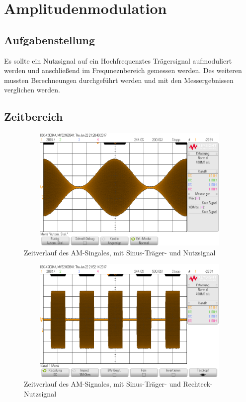 \section{Amplitudenmodulation}

\subsection{Aufgabenstellung}
Es sollte ein Nutzsignal auf ein Hochfrequenztes Tr\"agersignal aufmoduliert werden und anschlie\ss{}end im Frequneznbereich gemessen werden. Des weiteren mussten Berechneungen durchgef\"uhrt werden und mit den Messergebnissen verglichen werden.

\subsection{Zeitbereich}

\begin{figure}[H]
 \begin{center}
  \includegraphics[height=6cm,width=12cm]{OsziBilder/bsp3_am_sin_time}
 \end{center}
 \caption{Zeitverlauf des AM-Singales, mit Sinus-Träger- und Nutzsignal}
\end{figure}

\begin{figure}[H]
 \begin{center}
  \includegraphics[height=6cm,width=12cm]{OsziBilder/bsp3_am_rect_time}
 \end{center}
 \caption{Zeitverlauf des AM-Signales, mit Sinus-Träger- und Rechteck-Nutzsignal}
\end{figure}

